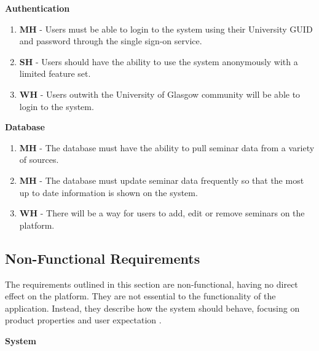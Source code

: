 \documentclass{l4proj}
\begin{document}
\textbf{Authentication}

\begin{enumerate}[label=A\arabic*]
    \item\label{functional_requirement:single_sign_on} \textbf{MH} - Users must be able to login to the system using their University GUID and password through the single sign-on service.
    \item\label{functional_requirement:use_system_anonymously} \textbf{SH} - Users should have the ability to use the system anonymously with a limited feature set.
    \item \textbf{WH} - Users outwith the University of Glasgow community will be able to login to the system.
\end{enumerate}

\textbf{Database}

\begin{enumerate}[label=D\arabic*]
    \item\label{functional_requirement:data_sources} \textbf{MH} - The database must have the ability to pull seminar data from a variety of sources.
    \item\label{functional_requirement:update_data_frequently} \textbf{MH} - The database must update seminar data frequently so that the most up to date information is shown on the system.
    \item \textbf{WH} - There will be a way for users to add, edit or remove seminars on the platform.
\end{enumerate}

\subsection{Non-Functional Requirements}
\label{section:non_functional_requirements}

The requirements outlined in this section are non-functional, having no direct effect on the platform. They are not essential to the functionality of the application. Instead, they describe how the system should behave, focusing on product properties and user expectation \citep{requirements}.

\textbf{System}
\end{document}
